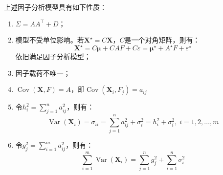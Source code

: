 \begin{property}\label{prop:FactorAnalysis}
	上述因子分析模型具有如下性质：
	\begin{enumerate}
		\item $\Sigma=AA^{\top}+D$；
		\item 模型不受单位影响。若$\mathbf{X}^{\star}=C\mathbf{X}$，$C$是一个对角矩阵，则有：
		\begin{equation*}
			\mathbf{X}^{\star}=C\boldsymbol{\mu}+CAF+C\varepsilon=\boldsymbol{\mu}^{\star}+A^{\star}F+\varepsilon^{\star}
		\end{equation*}
		依旧满足因子分析模型；
		\item 因子载荷不唯一；
		\item $\operatorname{Cov}(\mathbf{X},F)=A$，即$\operatorname{Cov}(\mathbf{X}_i,F_j)=a_{ij}$
		\item 令$h_i^2=\sum\limits_{j=1}^{n}a_{ij}^2$，则有：
		\begin{equation*}
			\operatorname{Var}(\mathbf{X}_i)=\sigma_{ii}=\sum_{j=1}^{n}a_{ij}^2+\sigma_i^2=h_i^2+\sigma_i^2,\;i=1,2,\dots,m
		\end{equation*}
		\item 令$g_j^2=\sum\limits_{i=1}^{m}a_{ij}^2$，则有：
		\begin{equation*}
			\sum_{i=1}^{m}\operatorname{Var}(\mathbf{X}_i)=\sum_{j=1}^{n}g_j^2+\sum_{i=1}^{n}\sigma_i^2
		\end{equation*}
	\end{enumerate}
\end{property}
